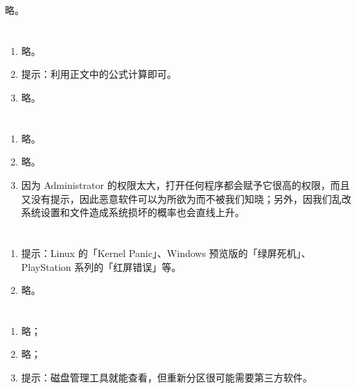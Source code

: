 略。

\section{}

\begin{enumerate}
  \item 略。
  \item 提示：利用正文中的公式计算即可。
  \item 略。
\end{enumerate}

\section{}

\begin{enumerate}
  \item 略。
  \item 略。
  \item 因为 Administrator 的权限太大，打开任何程序都会赋予它很高的权限，而且又没有提示，因此恶意软件可以为所欲为而不被我们知晓；另外，因我们乱改系统设置和文件造成系统损坏的概率也会直线上升。
\end{enumerate}

\section{}

\begin{enumerate}
  \item 提示：Linux 的「Kernel Panic」、Windows 预览版的「绿屏死机」、PlayStation 系列的「红屏错误」等。
  \item 略。
\end{enumerate}

\section{}

\begin{enumerate}
  \item 略；
  \item 略；
  \item 提示：磁盘管理工具就能查看，但重新分区很可能需要第三方软件。
\end{enumerate}

\section{}

